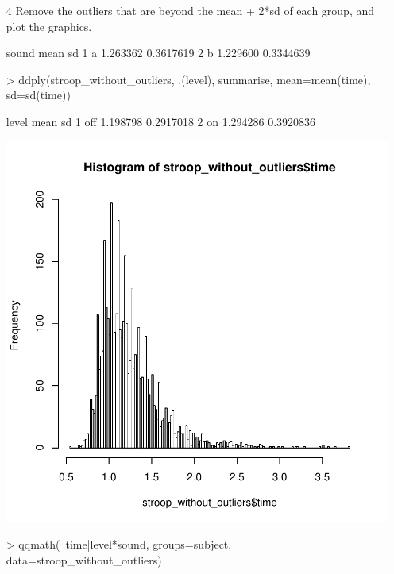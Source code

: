 \documentclass[12pt,a4paper]{article}
\begin{document}
\begin{itemize}
\item[4] Remove the outliers that are beyond the mean + 2*sd of each group, and plot the graphics.
\begin{Schunk}
\begin{Soutput}
  sound     mean        sd
1     a 1.263362 0.3617619
2     b 1.229600 0.3344639
\end{Soutput}
\begin{Sinput}
> ddply(stroop_without_outliers, .(level), summarise, mean=mean(time), sd=sd(time))
\end{Sinput}
\begin{Soutput}
  level     mean        sd
1   off 1.198798 0.2917018
2    on 1.294286 0.3920836
\end{Soutput}
\end{Schunk}
\includegraphics{report-005}
\begin{Schunk}
\begin{Sinput}
> qqmath(~time|level*sound, groups=subject, data=stroop_without_outliers)
\end{Sinput}
\end{Schunk}

\end{itemize}
\end{document}
